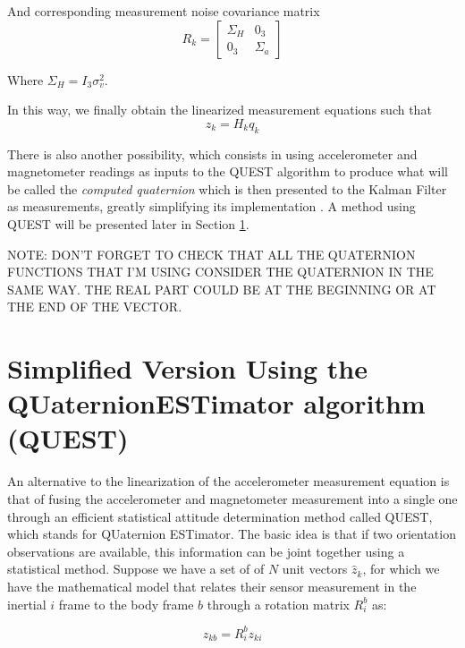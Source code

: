\documentclass[a4paper,10pt]{article}
\begin{document}
\begin{itemize}
And corresponding measurement noise covariance matrix 
\begin{equation}
 R_k = \left[\begin{matrix}
	      \Sigma_H &   0_3 \\
	       0_3     &   \Sigma_a
	     \end{matrix}\right]
\end{equation}

Where $\Sigma_H = I_3 \sigma_v^2$.

In this way, we finally obtain the linearized measurement equations such that
\begin{equation}
 z_k = H_k q_k 
\end{equation}


There is also another possibility, which consists in using accelerometer and magnetometer readings as inputs to the QUEST \cite{Shuster1981} algorithm to produce what will be called the \emph{computed quaternion} which is then presented to the Kalman Filter as measurements, greatly simplifying its implementation \cite{Shuster1981}. A method using QUEST will be presented later in Section \ref{sect:questSection}. 

NOTE: DON'T FORGET TO CHECK THAT ALL THE QUATERNION FUNCTIONS THAT I'M USING CONSIDER THE QUATERNION IN THE SAME WAY. THE REAL PART COULD BE AT THE BEGINNING OR AT THE END OF THE VECTOR. 


\end{itemize}



\section{Simplified Version Using the QUaternionESTimator algorithm (QUEST)}
\label{sect:questSection}
An alternative to the linearization of the accelerometer measurement equation is that of fusing the accelerometer and magnetometer measurement into a single one through an efficient statistical attitude determination method called QUEST, which stands for QUaternion ESTimator. The basic idea is that if two orientation observations are available, this information can be joint together using a statistical method. Suppose we have a set of of $N$ unit vectors $\hat{z}_k$, for which we have the mathematical model	 that relates their sensor measurement in the inertial ${i}$ frame to the body frame ${b}$ through a rotation matrix $R^b_i$ as:

\begin{equation}
 z_{kb} = R^b_i z_{ki}
\end{equation}
\end{document}
